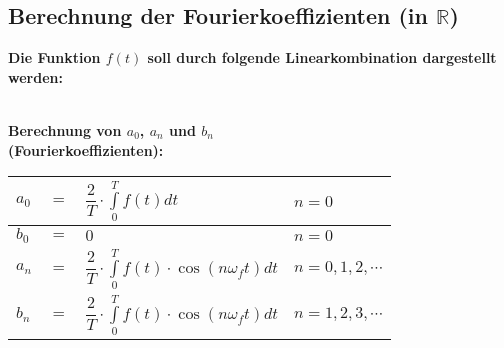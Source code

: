 	\subsection{Berechnung der Fourierkoeffizienten (in $\mathbb{R}$)}
		\textbf{Die Funktion $f(t)$ soll durch folgende Linearkombination dargestellt werden:}\\[3pt]
		\\[3pt]
		\begin{minipage}[t]{0.5\textwidth}
			\textbf{Berechnung von $a_0$, $a_n$ und $b_n$\\[1pt] (Fourierkoeffizienten):}\\[3pt]
			\renewcommand{\arraystretch}{2}
				\begin{tabular}{|lll|l|}
					\hline
					$\displaystyle a_0$ & $=$ & $\displaystyle \dfrac{2}{T} \cdot \int\limits_{0}^{T} f(t) dt$ & $\displaystyle n = 0$\\[0.2pt]
					\hline
					$\displaystyle b_0$ & $\displaystyle =$ & $\displaystyle 0$ & $\displaystyle n = 0$\\
					\hline
					$\displaystyle a_n$ & $\displaystyle =$ & $\displaystyle \dfrac{2}{T} \cdot \int\limits_{0}^{T} f(t) \cdot \cos(n \omega_f t) dt$ & $\displaystyle n = 0, 1, 2, \cdots$\\
					\hline
					$\displaystyle b_n$ & $\displaystyle =$ & $\displaystyle \dfrac{2}{T} \cdot \int\limits_{0}^{T} f(t) \cdot \cos(n \omega_f t) dt$ & $\displaystyle n = 1, 2, 3, \cdots$\\
					\hline
				\end{tabular}
			\renewcommand{\arraystretch}{1}
		\end{minipage}
